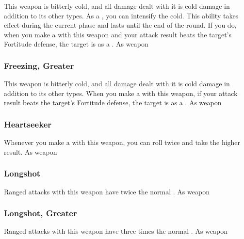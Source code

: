 This weapon is bitterly cold, and all damage dealt with it is cold damage in addition to its other types.
As a , you can intensify the cold.
This ability takes effect during the current phase and lasts until the end of the round.
If you do, when you make a  with this weapon and your attack result beats the target's Fortitude defense, the target is \fatigued as a .
 
 As weapon
\lowercase{\hypertarget{item:Freezing, Greater}{}}\label{item:Freezing, Greater}
\hypertarget{item:Freezing, Greater}{\subsubsection{Freezing, Greater\hfill{}}}
This weapon is bitterly cold, and all damage dealt with it is cold damage in addition to its other types.
When you make a  with this weapon, if your attack result beats the target's Fortitude defense, the target is \fatigued as a .
 
 As weapon
\lowercase{\hypertarget{item:Heartseeker}{}}\label{item:Heartseeker}
\hypertarget{item:Heartseeker}{\subsubsection{Heartseeker\hfill{}}}
Whenever you make a  with this weapon, you can roll twice and take the higher result.
 
 As weapon
\lowercase{\hypertarget{item:Longshot}{}}\label{item:Longshot}
\hypertarget{item:Longshot}{\subsubsection{Longshot\hfill{}}}
Ranged attacks with this weapon have twice the normal .
 
 As weapon
\lowercase{\hypertarget{item:Longshot, Greater}{}}\label{item:Longshot, Greater}
\hypertarget{item:Longshot, Greater}{\subsubsection{Longshot, Greater\hfill{}}}
Ranged attacks with this weapon have three times the normal .
 
 As weapon
\lowercase{\hypertarget{item:Merciful}{}}\label{item:Merciful}
